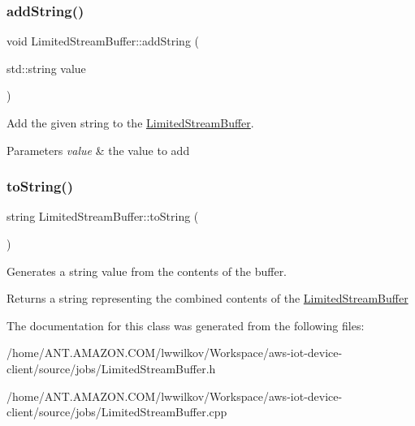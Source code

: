 \subsubsection{\texorpdfstring{add\+String()}{addString()}}
{\footnotesize\ttfamily void Limited\+Stream\+Buffer\+::add\+String (\begin{DoxyParamCaption}\item[{std\+::string}]{value }\end{DoxyParamCaption})}



Add the given string to the \hyperlink{class_aws_1_1_iot_1_1_device_client_1_1_jobs_1_1_limited_stream_buffer}{Limited\+Stream\+Buffer}. 


\begin{DoxyParams}{Parameters}
{\em value} & the value to add \\
\hline
\end{DoxyParams}
\mbox{\label{class_aws_1_1_iot_1_1_device_client_1_1_jobs_1_1_limited_stream_buffer_a99396226499c5aee2bc55c903d23c48e}} 
\subsubsection{\texorpdfstring{to\+String()}{toString()}}
{\footnotesize\ttfamily string Limited\+Stream\+Buffer\+::to\+String (\begin{DoxyParamCaption}{ }\end{DoxyParamCaption})}



Generates a string value from the contents of the buffer. 

\begin{DoxyReturn}{Returns}
a string representing the combined contents of the \hyperlink{class_aws_1_1_iot_1_1_device_client_1_1_jobs_1_1_limited_stream_buffer}{Limited\+Stream\+Buffer} 
\end{DoxyReturn}


The documentation for this class was generated from the following files\+:\begin{DoxyCompactItemize}
\item 
/home/\+A\+N\+T.\+A\+M\+A\+Z\+O\+N.\+C\+O\+M/lwwilkov/\+Workspace/aws-\/iot-\/device-\/client/source/jobs/Limited\+Stream\+Buffer.\+h\item 
/home/\+A\+N\+T.\+A\+M\+A\+Z\+O\+N.\+C\+O\+M/lwwilkov/\+Workspace/aws-\/iot-\/device-\/client/source/jobs/Limited\+Stream\+Buffer.\+cpp\end{DoxyCompactItemize}
